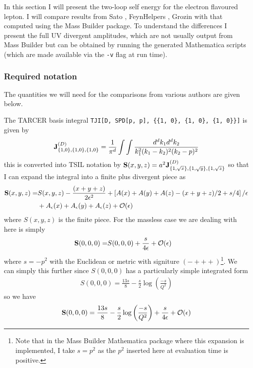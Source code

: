 \documentclass[11pt]{article}
\newcommand{\mb}{\textsf{Mass Builder} }
\begin{document}
In this section I will present the two-loop self energy for the electron flavoured lepton.  I will compare results from Sato \cite{Sato2013}, FeynHelpers \cite{Shtabovenko}, Grozin \cite{Grozin2005} with that computed using the \mb package.  To understand the differences I present the full UV divergent amplitudes, which are not usually output from \mb but can be obtained by running the generated Mathematica scripts (which are made available via the \lstinline{-v} flag at run time).\\

\subsubsection{Required notation}
The quantities we will need for the comparisons from various authors are given below.

The TARCER basis integral \lstinline|TJI[D, SPD[p, p], {{1, 0}, {1, 0}, {1, 0}}]| is given by \cite{Mertig1998}
\begin{align}
\bold{J}_{ \{1,0\}, \{1,0\}, \{1,0\}}^{(D)} = \frac{1}{\pi^d} \int\int \frac{ d^dk_1 d^dk_2}{k_1^2(k_1-k_2)^2(k_2-p)^2}
\end{align}
this is converted into TSIL notation by $\bold{S}(x,y,z) = a^2 \bold{J}_{ \{1,\sqrt{x}\}, \{1,\sqrt{y}\}, \{1,\sqrt{z}\}}^{(D)}$ so that I can expand the integral into a finite plus divergent piece as
\begin{align}
\begin{split}
\bold{S}(x,y,z)= &S(x,y,z) -\frac{(x+y+z)}{2\epsilon^2} + \left[A(x)+A(y)+A(z)-(x+y+z)/2+s/4\right]/\epsilon\\ &+ A_{\epsilon}(x)+ A_{\epsilon}(y)+ A_{\epsilon}(z)+\mathcal{O}(\epsilon)
\end{split}
\end{align}
where $S(x,y,z)$ is the finite piece. For the massless case we are dealing with here is simply
\begin{align}
\bold{S}(0,0,0)= &S(0,0,0) + \frac{s}{4\epsilon} + \mathcal{O}(\epsilon)
\end{align}
where $s=-p^2$ with the Euclidean or metric with signiture $(-+++)$\footnote{Note that in the \mb Mathematica package where this expansion is implemented, I take $s=p^2$ as the $p^2$ inserted here at evaluation time is positive.}.  We can simply this further since $S(0,0,0)$ has a particularly simple integrated form \cite{Martin2003}
\begin{align}
S(0,0,0) = \frac{13s}{8}-\frac{s}{2}\log\left(\frac{-s}{Q^2}\right)
\end{align}
so we have
\begin{align}
\bold{S}(0,0,0) =  \frac{13s}{8}-\frac{s}{2}\log\left(\frac{-s}{Q^2}\right) + \frac{s}{4\epsilon}   + \mathcal{O}(\epsilon) \label{eqn:J_expand}
\end{align}
\end{document}
